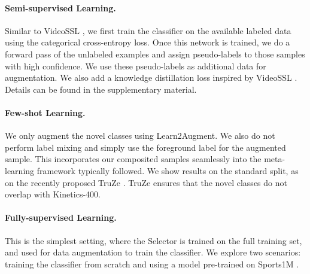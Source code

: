 \documentclass[runningheads]{llncs}
\newcommand{\Method}{Learn2Augment\xspace}
\begin{document}
\paragraph{Semi-supervised Learning.}
Similar to VideoSSL \cite{Jing_2021_WACV}, we first train the classifier on the available labeled data using the categorical cross-entropy loss. Once this network is trained, we do a forward pass of the unlabeled examples and assign pseudo-labels to those samples with high confidence. We use these pseudo-labels as additional data for augmentation. We also add a knowledge distillation loss inspired by VideoSSL \cite{Jing_2021_WACV}. Details can be found in the supplementary material.



\paragraph{Few-shot Learning.}
We only augment the novel classes using \Method. We also do not perform label mixing and simply use the foreground label for the augmented sample. This incorporates our composited samples seamlessly into the meta-learning framework typically followed. 
We show results on the standard split, as on the recently proposed TruZe \cite{truze}. TruZe ensures that the novel classes do not overlap with Kinetics-400.

\paragraph{Fully-supervised Learning.} This is the simplest setting, where the Selector is trained on the full training set, and used for data augmentation to train the classifier. We explore two scenarios: training the classifier from scratch and using a model pre-trained on Sports1M \cite{sports1M}.
\end{document}
